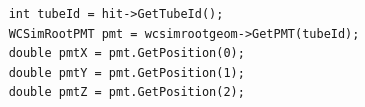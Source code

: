 \begin{lstlisting}
    int tubeId = hit->GetTubeId();
    WCSimRootPMT pmt = wcsimrootgeom->GetPMT(tubeId);
    double pmtX = pmt.GetPosition(0);
    double pmtY = pmt.GetPosition(1);
    double pmtZ = pmt.GetPosition(2);
\end{lstlisting}








